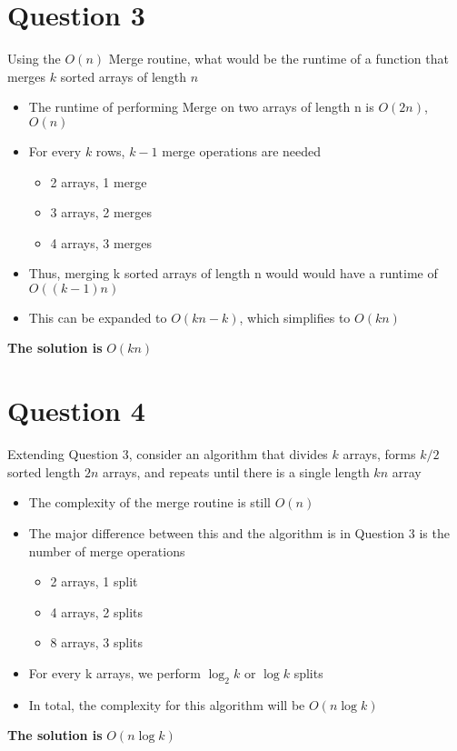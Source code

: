 \documentclass{article}
\begin{document}
    \section{Question 3}
    Using the $O(n)$ Merge routine, what would be the runtime of a function that merges $k$ sorted arrays of length $n$
        \begin{itemize}
            \item{The runtime of performing Merge on two arrays of length n is $O(2n)$, $O(n)$}
            \item{For every $k$ rows, $k - 1$ merge operations are needed}
                \begin{itemize}
                    \item{2 arrays, 1 merge}
                    \item{3 arrays, 2 merges}
                    \item{4 arrays, 3 merges}
                \end{itemize}
            \item{Thus, merging k sorted arrays of length n would would have a runtime of $O((k-1)n)$}
            \item{This can be expanded to $O(kn - k)$, which simplifies to $O(kn)$}
        \end{itemize}
    \textbf{The solution is} $O(kn)$

    \section{Question 4}
    Extending Question 3, consider an algorithm that divides $k$ arrays, forms $k/2$ sorted length $2n$ arrays,
    and repeats until there is a single length $kn$ array
        \begin{itemize}
            \item{The complexity of the merge routine is still $O(n)$}
            \item{The major difference between this and the algorithm is in Question 3 is the number of merge operations}
                \begin{itemize}
                  \item{2 arrays, 1 split}
                  \item{4 arrays, 2 splits}
                  \item{8 arrays, 3 splits}
                \end{itemize}
            \item{For every k arrays, we perform $\log_2 k$ or $\log k$ splits}
            \item{In total, the complexity for this algorithm will be $O(n\log k)$}
        \end{itemize}
    \textbf{The solution is} $O(n\log k)$
\end{document}
